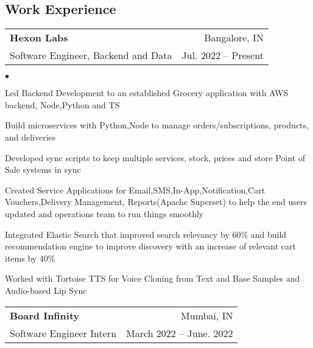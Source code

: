 \documentclass[margin, 11pt]{res}
\makeatletter
\newcommand{\li}{https://linkedin.com/in/harishvadaparty}
\newcommand{\gh}{https://github.com/Harryalways317}
\newcommand{\personalsite}{https://hvadaparty.vercel.app}
\newcommand{\resumeSubheading}[4]{

\begin{tabular*}{1.01\textwidth}{@{\hspace{-4pt}}l @{\extracolsep{\fill}} r}
\textbf{#1} & #2 \\
      {#3} &  {#4}
\end{tabular*}\vspace{-2pt}
}
\newenvironment{list2}{
	\begin{list}{$\bullet$}{%
	    \small
		\setlength{\itemsep}{0in}
		\setlength{\parsep}{0in} \setlength{\parskip}{0in}
		\setlength{\topsep}{0in} \setlength{\partopsep}{0in}
		\setlength{\leftmargin}{0.2in}}}{\end{list}}
\makeatother
\begin{document}
\address{
    \small +91-6301786793 $|$ 
    \href{mailto:harishvadapartygmail.com}{harishvadaparty@gmail.com} $|$ 
    \href{\li}{linkedin.com/in/harishvadaparty} $|$
    \href{\gh}{github.com/Harryalways317}
}

\begin{resume}

\section{\sc Work Experience}

\vspace{2pt}

\resumeSubheading{{\bf Hexon Labs}}{Bangalore, IN}
                 {Software Engineer, Backend and Data}{Jul. 2022 -- Present}

\begin{list2}
\item{Led Backend Development to an established Grocery application with AWS backend, Node,Python and TS}
\item{Build microservices with Python,Node to  manage orders/subscriptions, products, and deliveries}
\item{Developed sync scripts to keep multiple services, stock, prices and store Point of Sale systems in sync}
\item{Created Service Applications for Email,SMS,In-App,Notification,Cart Vouchers,Delivery Management, Reports(Apache Superset) to help the end users updated and operations team to run things smoothly}
\item{Integrated Elastic Search that improved search relevancy by 60\% and build recommendation engine to improve discovery with an increase of relevant cart items by 40\% }
\item{Worked with Tortoise TTS for Voice Cloning from Text and Base Samples and Audio-based Lip Sync}
\end{list2}
\resumeSubheading{{\bf Board Infinity}}{Mumbai, IN}
                 {Software Engineer Intern}{March 2022 -- June. 2022}
                 

\end{resume}
\end{document}
